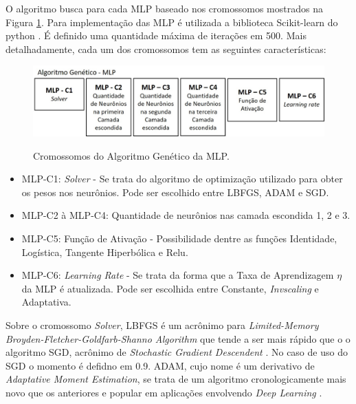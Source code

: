 O algoritmo busca para cada MLP baseado nos cromossomos mostrados na Figura \ref{fig:cap3_cromo_mlp}. Para implementação das MLP é utilizada a biblioteca Scikit-learn do python \cite{scikit-learn}. É definido uma quantidade máxima de iterações em 500. Mais detalhadamente, cada um dos cromossomos tem as seguintes características:

\begin{figure}[!htbp]
    \centering
    \caption{Cromossomos do Algoritmo Genético da MLP.}
    \includegraphics[width=\textwidth]{Figuras/cap3/cromo_mlp.jpg}
    \label{fig:cap3_cromo_mlp}
\end{figure}

\begin{itemize}
    \item MLP-C1: \textit{Solver} - Se trata do algoritmo de optimização utilizado para obter os pesos nos neurônios. Pode ser escolhido entre LBFGS, ADAM e SGD. 
    
    \item MLP-C2 à MLP-C4: Quantidade de neurônios nas camada escondida 1, 2 e 3.
    
    \item MLP-C5: Função de Ativação - Possibilidade dentre as funções Identidade, Logística, Tangente Hiperbólica e Relu.
    
    \item MLP-C6: \textit{Learning Rate} - Se trata da forma que a Taxa de Aprendizagem $\eta$ da MLP é atualizada. Pode ser escolhida entre Constante, \textit{Invscaling} e Adaptativa.
    
\end{itemize}

Sobre o cromossomo \textit{Solver}, LBFGS é um acrônimo para \textit{Limited\hyp{}Memory Broyden\hyp{}Fletcher\hyp{}Goldfarb\hyp{}Shanno Algorithm} que tende a ser mais rápido que o o algoritmo SGD, acrônimo de \textit{Stochastic Gradient Descendent} \cite{le2011optimization}. No caso de uso do SGD o momento é defidno em 0.9. ADAM, cujo nome é um derivativo de \textit{Adaptative Moment Estimation}, se trata de um algoritmo cronologicamente mais novo que os anteriores e popular em aplicações envolvendo \textit{Deep Learning} \cite{kingma2014adam, yi2020effective, jais2019adam}.

